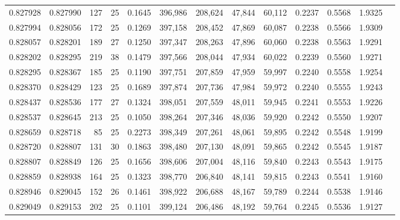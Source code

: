 \begin{tabular}{rrrrrrrrrrrrr}
0.827928 & 0.827990 &   127 &  25 &                                     0.1645 & 396,986 & 208,624 &  47,844 &  60,112 & 0.2237 & 0.5568 & 1.9325 \\
0.827994 & 0.828056 &   172 &  25 &                                     0.1269 & 397,158 & 208,452 &  47,869 &  60,087 & 0.2238 & 0.5566 & 1.9309 \\
0.828057 & 0.828201 &   189 &  27 &                                     0.1250 & 397,347 & 208,263 &  47,896 &  60,060 & 0.2238 & 0.5563 & 1.9291 \\
0.828202 & 0.828295 &   219 &  38 &                                     0.1479 & 397,566 & 208,044 &  47,934 &  60,022 & 0.2239 & 0.5560 & 1.9271 \\
0.828295 & 0.828367 &   185 &  25 &                                     0.1190 & 397,751 & 207,859 &  47,959 &  59,997 & 0.2240 & 0.5558 & 1.9254 \\
0.828370 & 0.828429 &   123 &  25 &                                     0.1689 & 397,874 & 207,736 &  47,984 &  59,972 & 0.2240 & 0.5555 & 1.9243 \\
0.828437 & 0.828536 &   177 &  27 &                                     0.1324 & 398,051 & 207,559 &  48,011 &  59,945 & 0.2241 & 0.5553 & 1.9226 \\
0.828537 & 0.828645 &   213 &  25 &                                     0.1050 & 398,264 & 207,346 &  48,036 &  59,920 & 0.2242 & 0.5550 & 1.9207 \\
0.828659 & 0.828718 &    85 &  25 &                                     0.2273 & 398,349 & 207,261 &  48,061 &  59,895 & 0.2242 & 0.5548 & 1.9199 \\
0.828720 & 0.828807 &   131 &  30 &                                     0.1863 & 398,480 & 207,130 &  48,091 &  59,865 & 0.2242 & 0.5545 & 1.9187 \\
0.828807 & 0.828849 &   126 &  25 &                                     0.1656 & 398,606 & 207,004 &  48,116 &  59,840 & 0.2243 & 0.5543 & 1.9175 \\
0.828859 & 0.828938 &   164 &  25 &                                     0.1323 & 398,770 & 206,840 &  48,141 &  59,815 & 0.2243 & 0.5541 & 1.9160 \\
0.828946 & 0.829045 &   152 &  26 &                                     0.1461 & 398,922 & 206,688 &  48,167 &  59,789 & 0.2244 & 0.5538 & 1.9146 \\
0.829049 & 0.829153 &   202 &  25 &                                     0.1101 & 399,124 & 206,486 &  48,192 &  59,764 & 0.2245 & 0.5536 & 1.9127 \\

\end{tabular}
